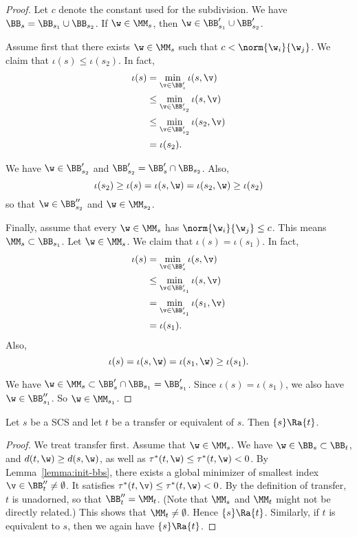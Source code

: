 \begin{proof}
Let $c$ denote the constant used for the subdivision.
We have $\BB_s =
\BB_{s_1}\cup \BB_{s_2}$.  If $\w\in \MM_s$, then
$\w\in \BB'_{s_1}\cup\BB'_{s_2}$.

Assume first that there exists $\w\in \MM_s$ such that $c < \norm{\w_i}{\w_j}$.
We claim that $\iota(s) \le \iota(s_2)$.  In fact,
\begin{align*}
\iota(s) &=\min_{\v\in \BB'_s} \iota(s,\v)\\
&\le \min_{\v\in \BB'_{s_2}} \iota(s,\v) \\
&\le \min_{\v\in \BB'_{s_2}} \iota(s_2,\v) \\
&=\iota(s_2).
\end{align*}

We have $\w\in\BB'_{s_2}$ and $\BB'_{s_2} = \BB'_s \cap \BB_{s_2}$.
Also,
\[
\iota(s_2)\ge \iota(s) = \iota(s,\w) = \iota(s_2,\w) \ge \iota(s_2)
\]
so that $\w\in \BB''_{s_2}$ and $\w\in \MM_{s_2}$.

Finally, assume that every $\w\in\MM_s$ has $\norm{\w_i}{\w_j}\le c$.  This
means $\MM_s\subset \BB_{s_1}$. Let $\w\in\MM_s$.
We claim that $\iota(s) = \iota(s_1)$.  In fact,
\begin{align*}
\iota(s) &= \min_{\v\in \BB'_s} \iota(s,\v) \\
   &\le \min_{\v\in\BB'_{s_1}}\iota(s,\v)\\
   &=\min_{\v\in \BB'_{s_1}}\iota(s_1,\v)\\
   &=\iota(s_1).
\end{align*}
Also, 
\[
\iota(s) = \iota(s,\w) = \iota(s_1,\w) \ge \iota(s_1).
\]

We have $\w\in\MM_s\subset \BB'_s\cap \BB_{s_1} = \BB'_{s_1}$.
Since $\iota(s)=\iota(s_1)$, we also have $\w\in \BB''_{s_1}$.
So $\w\in \MM_{s_1}$.
\end{proof}

\begin{lemma}  
Let $s$ be a SCS and let
 $t$ be a transfer or equivalent of $s$.  
Then  $\{s\}\Ra\{t\}$.
\end{lemma}

\begin{proof}
We treat transfer first.
Assume that $\w\in \MM_s$.
We have $\w\in \BB_s\subset\BB_t$, and $d(t,\w) \ge d(s,\w)$,
as well as $\tau^*(t,\w)\le\tau^*(t,\w)< 0$.   By Lemma~\ref{lemma:init-bbs}, there
exists a global minimizer of smallest index
$\v\in\BB''_t\ne\emptyset$.  It satisfies
$\tau^*(t,\v)\le\tau^*(t,\w)< 0$.  By the definition of transfer,
$t$
is unadorned, so that $\BB''_t=\MM_t$.  (Note that $\MM_s$ and
$\MM_t$
might not be directly related.)  This shows that
$\MM_t\ne\emptyset$.
Hence $\{s\}\Ra\{t\}$.  Similarly, if $t$ is equivalent to $s$,
then we again have $\{s\}\Ra\{t\}$.
\end{proof}


